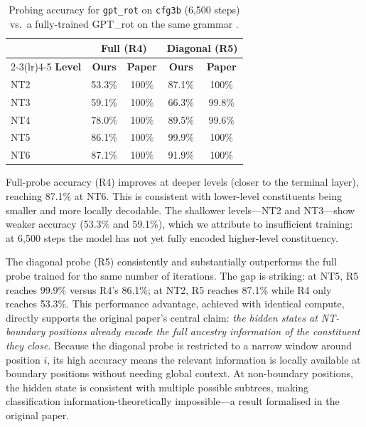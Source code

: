 \documentclass[10pt,twocolumn]{article}
\begin{document}
\begin{table}[h]
\centering
\caption{Probing accuracy for \texttt{gpt\_rot} on \texttt{cfg3b} (6{,}500 steps) vs.\ a fully-trained GPT\_rot on the same grammar \citep{allen-zhu2023physics}.}
\label{tab:probing}
\small
\begin{tabular}{lcccc}
\toprule
& \multicolumn{2}{c}{\textbf{Full (R4)}} & \multicolumn{2}{c}{\textbf{Diagonal (R5)}} \\
\cmidrule(lr){2-3}\cmidrule(lr){4-5}
\textbf{Level} & \textbf{Ours} & \textbf{Paper} & \textbf{Ours} & \textbf{Paper} \\
\midrule
NT2 & 53.3\% & 100\%            & 87.1\% & 100\%              \\
NT3 & 59.1\% & 100\%            & 66.3\% & 99.8\%             \\
NT4 & 78.0\% & 100\%            & 89.5\% & 99.6\%  \\
NT5 & 86.1\% & 100\%            & 99.9\% & 100\%              \\
NT6 & 87.1\% & 100\%            & 91.9\% & 100\%              \\
\bottomrule
\end{tabular}
\end{table}

Full-probe accuracy (R4) improves at deeper levels (closer to the terminal layer), reaching 87.1\% at NT6. This is consistent with lower-level constituents being smaller and more locally decodable. The shallower levels—NT2 and NT3—show weaker accuracy (53.3\% and 59.1\%), which we attribute to insufficient training: at 6{,}500 steps the model has not yet fully encoded higher-level constituency.

The diagonal probe (R5) consistently and substantially outperforms the full probe trained for the same number of iterations. The gap is striking: at NT5, R5 reaches 99.9\% versus R4's 86.1\%; at NT2, R5 reaches 87.1\% while R4 only reaches 53.3\%. This performance advantage, achieved with identical compute, directly supports the original paper's central claim: \emph{the hidden states at NT-boundary positions already encode the full ancestry information of the constituent they close}. Because the diagonal probe is restricted to a narrow window around position $i$, its high accuracy means the relevant information is locally available at boundary positions without needing global context. At non-boundary positions, the hidden state is consistent with multiple possible subtrees, making classification information-theoretically impossible—a result formalised in the original paper.
\end{document}
